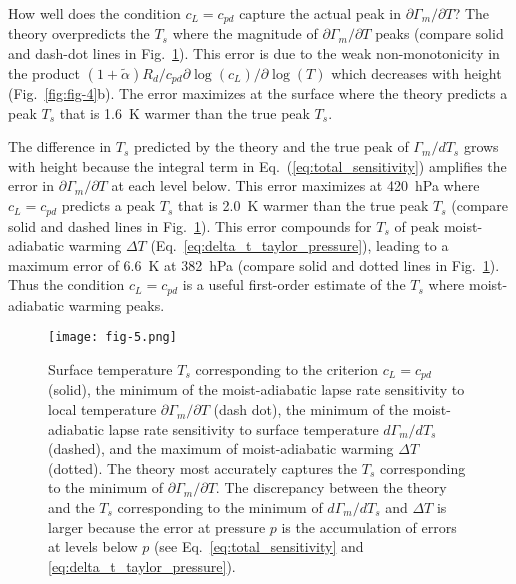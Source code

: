 \documentclass[draft]{ametsocV6.1}
\begin{document}
How well does the condition $c_L = c_{pd}$ capture the actual peak in $\partial\Gamma_m/\partial T$? The theory overpredicts the $T_s$ where the magnitude of $\partial\Gamma_m/\partial T$ peaks (compare solid and dash-dot lines in Fig.~\ref{fig:fig-5}). This error is due to the weak non-monotonicity in the product $(1+\tilde{\alpha})R_d/c_{pd}\partial\log(c_L)/\partial\log(T)$ which decreases with height (Fig.~\ref{fig:fig-4}b). The error maximizes at the surface where the theory predicts a peak $T_s$ that is 1.6~K warmer than the true peak $T_s$. 

The difference in $T_s$ predicted by the theory and the true peak of $\Gamma_m / d T_s$ grows with height because the integral term in Eq.~(\ref{eq:total_sensitivity}) amplifies the error in $\partial\Gamma_m / \partial T$ at each level below. This error maximizes at 420~hPa where $c_L = c_{pd}$ predicts a peak $T_s$ that is 2.0~K warmer than the true peak $T_s$ (compare solid and dashed lines in Fig.~\ref{fig:fig-5}). This error compounds for $T_s$ of peak moist-adiabatic warming $\Delta T$ (Eq.~\ref{eq:delta_t_taylor_pressure}), leading to a maximum error of 6.6~K at 382~hPa (compare solid and dotted lines in Fig.~\ref{fig:fig-5}). Thus the condition $c_L = c_{pd}$ is a useful first-order estimate of the $T_s$ where moist-adiabatic warming peaks.

\begin{figure}[htbp]
 \centering
 \texttt{[image: fig-5.png]}\\
 \caption{Surface temperature $T_s$ corresponding to the criterion $c_L=c_{pd}$ (solid), the minimum of the moist-adiabatic lapse rate sensitivity to local temperature $\partial \Gamma_m/\partial T$ (dash dot), the minimum of the moist-adiabatic lapse rate sensitivity to surface temperature $d \Gamma_m/dT_s$ (dashed), and the maximum of moist-adiabatic warming $\Delta T$ (dotted). The theory most accurately captures the $T_s$ corresponding to the minimum of $\partial \Gamma_m /\partial T$. The discrepancy between the theory and the $T_s$ corresponding to the minimum of $d\Gamma_m/dT_s$ and $\Delta T$ is larger because the error at pressure $p$ is the accumulation of errors at levels below $p$ (see Eq.~\ref{eq:total_sensitivity} and \ref{eq:delta_t_taylor_pressure}).}\label{fig:fig-5}
\end{figure}
\end{document}

